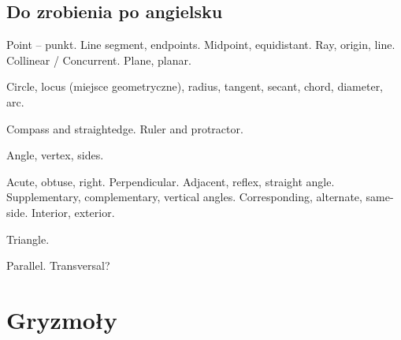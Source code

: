 \documentclass{parchment}
\begin{document}


\section{Do zrobienia po angielsku}
Point -- punkt.
Line segment, endpoints.
Midpoint, equidistant.
Ray, origin, line.
Collinear / Concurrent.
Plane, planar.

Circle, locus (miejsce geometryczne), radius, tangent, secant, chord, diameter, arc.

Compass and straightedge.
Ruler and protractor.

Angle, vertex, sides.

Acute, obtuse, right.
Perpendicular.
Adjacent, reflex, straight angle.
Supplementary, complementary, vertical angles.
Corresponding, alternate, same-side. Interior, exterior.

Triangle.

Parallel.
Transversal?

\chapter{Gryzmoły}
\end{document}
